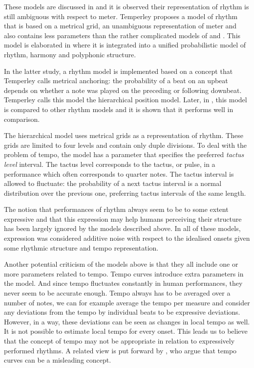 These models are discussed in \citet{temperley2007music} and it is observed their representation of rhythm is still ambiguous with respect to meter. Temperley proposes a model of rhythm that is based on a metrical grid, an unambiguous representation of meter and also contains less parameters than the rather complicated models of \citet{raphael2002hybrid} and \citet{cemgil2000rhythm}. This model is elaborated in \citet{temperley2009unified} where it is integrated into a unified probabilistic model of rhythm, harmony and polyphonic structure.

In the latter study, a rhythm model is implemented based on a concept that Temperley calls metrical anchoring: the probability of a beat on an upbeat depends on whether a note was played on the preceding or following downbeat. Temperley calls this model the hierarchical position model. Later, in \citet{temperley2010modeling}, this model is compared to other rhythm models and it is shown that it performs well in comparison. 

The hierarchical model uses metrical grids as a representation of rhythm. These grids are limited to four levels and contain only duple divisions. To deal with the problem of tempo, the model has a parameter that specifies the preferred \textit{tactus level} interval. The tactus level corresponds to the tactus, or pulse, in a performance which often corresponds to quarter notes. The tactus interval is allowed to fluctuate: the probability of a next tactus interval is a normal distribution over the previous one, preferring tactus intervals of the same length.

The notion that performances of rhythm always seem to be to some extent expressive and that this expression may help humans perceiving their structure has been largely ignored by the models described above. In all of these models, expression was considered additive noise with respect to the idealised onsets given some rhythmic structure and tempo representation. 

Another potential criticism of the models above is that they all include one or more parameters related to tempo. Tempo curves introduce extra parameters in the model. And since tempo fluctuates constantly in human performances, they never seem to be accurate enough. Tempo always has to be averaged over a number of notes, we can for example average the tempo per measure and consider any deviations from the tempo by individual beats to be expressive deviations. However, in a way, these deviations can be seen as changes in local tempo as well. It is not possible to estimate local tempo for every onset. This leads us to believe that the concept of tempo may not be appropriate in relation to expressively performed rhythms. A related view is put forward by \citet{desain1993tempo}, who argue that tempo curves can be a misleading concept.

